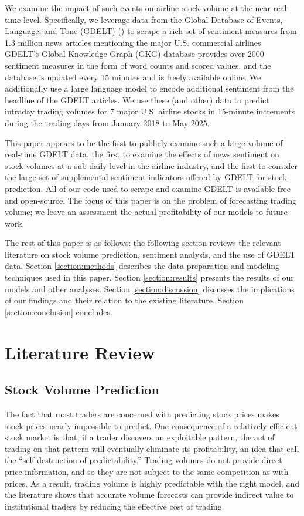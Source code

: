 \documentclass[12pt]{article}
\begin{document}
We examine the impact of such events on airline stock volume at the near-real-time level. Specifically, we leverage data from the Global Database of Events, Language, and Tone (GDELT) (\textcite{leetaru2013gdelt}) to scrape a rich set of sentiment measures from 1.3 million news articles mentioning the major U.S. commercial airlines. GDELT's Global Knowledge Graph (GKG) database provides over 2000 sentiment measures in the form of word counts and scored values, and the database is updated every 15 minutes and is freely available online. We additionally use a large language model to encode additional sentiment from the headline of the GDELT articles. We use these (and other) data to predict intraday trading volumes for 7 major U.S. airline stocks in 15-minute increments during the trading days from January 2018 to May 2025.

This paper appears to be the first to publicly examine such a large volume of real-time GDELT data, the first to examine the effects of news sentiment on stock volumes at a sub-daily level in the airline industry, and the first to consider the large set of supplemental sentiment indicators offered by GDELT for stock prediction. All of our code used to scrape and examine GDELT is available free and open-source. The focus of this paper is on the problem of forecasting trading volume; we leave an assessment the actual profitability of our models to future work.

The rest of this paper is as follows: the following section reviews the relevant literature on stock volume prediction, sentiment analysis, and the use of GDELT data. Section \ref{section:methods} describes the data preparation and modeling techniques used in this paper. Section \ref{section:results} presents the results of our models and other analyses. Section \ref{section:discussion} discusses the implications of our findings and their relation to the existing literature. Section \ref{section:conclusion} concludes.

\section{Literature Review}
\label{section:litreview}

\subsection{Stock Volume Prediction}
The fact that most traders are concerned with predicting stock prices makes stock prices nearly impossible to predict. One consequence of a relatively efficient stock market is that, if a trader discovers an exploitable pattern, the act of trading on that pattern will eventually eliminate its profitability, an idea that \textcite{timmermann2004efficient} call the ``self-destruction of predictability.'' Trading volumes do not provide direct price information, and so they are not subject to the same competition as with prices. As a result, trading volume is highly predictable with the right model, and the literature shows that accurate volume forecasts can provide indirect value to institutional traders by reducing the effective cost of trading.
\end{document}
